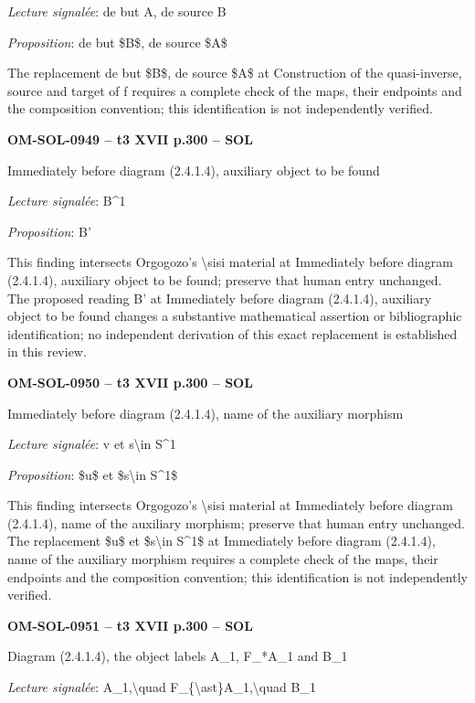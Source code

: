 \emph{Lecture signalée}: de but A, de source B\par
\emph{Proposition}: de but \$B\$, de source \$A\$\par
The replacement de but \$B\$, de source \$A\$ at Construction of the quasi-inverse, source and target of f requires a complete check of the maps, their endpoints and the composition convention; this identification is not independently verified.\par
\par\noindent\textbf{OM-SOL-0949 -- t3 XVII p.300 -- SOL}\par
Immediately before diagram (2.4.1.4), auxiliary object to be found\par
\emph{Lecture signalée}: B\textasciicircum{}1\par
\emph{Proposition}: B'\par
This finding intersects Orgogozo's \textbackslash{}sisi material at Immediately before diagram (2.4.1.4), auxiliary object to be found; preserve that human entry unchanged. The proposed reading B' at Immediately before diagram (2.4.1.4), auxiliary object to be found changes a substantive mathematical assertion or bibliographic identification; no independent derivation of this exact replacement is established in this review.\par
\par\noindent\textbf{OM-SOL-0950 -- t3 XVII p.300 -- SOL}\par
Immediately before diagram (2.4.1.4), name of the auxiliary morphism\par
\emph{Lecture signalée}: v et s\textbackslash{}in S\textasciicircum{}1\par
\emph{Proposition}: \$u\$ et \$s\textbackslash{}in S\textasciicircum{}1\$\par
This finding intersects Orgogozo's \textbackslash{}sisi material at Immediately before diagram (2.4.1.4), name of the auxiliary morphism; preserve that human entry unchanged. The replacement \$u\$ et \$s\textbackslash{}in S\textasciicircum{}1\$ at Immediately before diagram (2.4.1.4), name of the auxiliary morphism requires a complete check of the maps, their endpoints and the composition convention; this identification is not independently verified.\par
\par\noindent\textbf{OM-SOL-0951 -- t3 XVII p.300 -- SOL}\par
Diagram (2.4.1.4), the object labels A\_1, F\_*A\_1 and B\_1\par
\emph{Lecture signalée}: A\_1,\textbackslash{}quad F\_\{\textbackslash{}ast\}A\_1,\textbackslash{}quad B\_1\par
